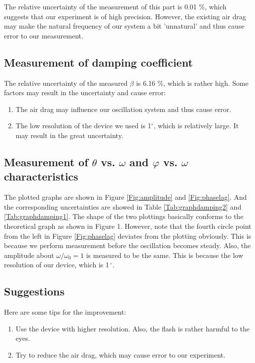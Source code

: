 \documentclass[a4paper]{article}
\begin{document}
The relative uncertainty of the measurement of this part is 0.01 \%, which suggests that our experiment is of high precision. However, the existing air drag may make the natural frequency of our system a bit 'unnatural' and thus cause error to our measurement.

\subsection{Measurement of damping coefficient}

The relative uncertainty of the measured $\beta$ is 6.16 \%, which is rather high. Some factors may result in the uncertainty and cause error:
\begin{enumerate}
\item The air drag may influence our oscillation system and thus cause error.
\item The low resolution of the device we used is 1$^\circ$, which is relatively large. It may result in the great uncertainty.
\end{enumerate}

\subsection{Measurement of  $\theta$ vs. $\omega$ and $\varphi$ vs. $\omega$ characteristics}
The plotted graphs are shown in Figure \ref{Fig:amplitude} and \ref{Fig:phaselag}. And the corresponding uncertainties are showed in Table \ref{Tab:graphdamping2} and \ref{Tab:graphdamping1}. The shape of the two plottings basically conforms to the theoretical graph as shown in Figure 1. However, note that the fourth circle point from the left in Figure \ref{Fig:phaselag} deviates from the plotting obviously. This is because we perform measurement before the oscillation becomes steady. Also, the amplitude about $\omega/\omega_{0} = 1$ is measured to be the same. This is because the low resolution of our device, which is 1\,$^\circ$. 


\subsection{Suggestions}
Here are some tips for the improvement:
\begin{enumerate}
\item Use the device with higher resolution. Also, the flash is rather harmful to the eyes.
\item Try to reduce the air drag, which may cause error to our experiment.
\end{enumerate}
\end{document}
